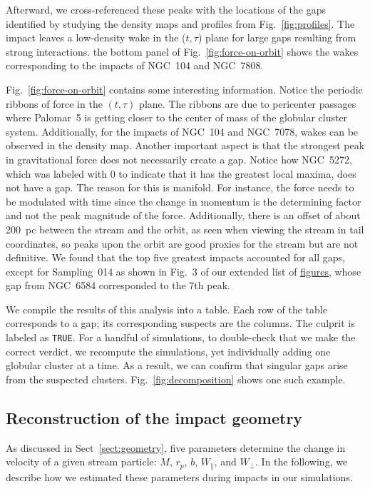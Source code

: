         Afterward, we cross-referenced these peaks with the locations of the gaps identified by studying the density maps and profiles from Fig.~\ref{fig:profiles}. The impact leaves a low-density wake in the ($t,\tau$) plane for large gaps resulting from strong interactions. the bottom panel of Fig.~\ref{fig:force-on-orbit} shows the wakes corresponding to the impacts of NGC~104 and NGC~7808.

        Fig.~\ref{fig:force-on-orbit} contains some interesting information. Notice the periodic ribbons of force in the $(t,\tau)$ plane. The ribbons are due to pericenter passages where Palomar~5 is getting closer to the center of mass of the globular cluster system. Additionally, for the impacts of NGC~104 and NGC~7078, wakes can be observed in the density map. Another important aspect is that the strongest peak in gravitational force does not necessarily create a gap. Notice how NGC~5272, which was labeled with 0 to indicate that it has the greatest local maxima, does not have a gap. The reason for this is manifold. For instance, the force needs to be modulated with time since the change in momentum is the determining factor and not the peak magnitude of the force.  Additionally, there is an offset of about 200~pc between the stream and the orbit, as seen when viewing the stream in tail coordinates, so peaks upon the orbit are good proxies for the stream but are not definitive. We found that the top five greatest impacts accounted for all gaps, except for Sampling~014 as shown in Fig.~3 of our extended list of  \href{10.5281/zenodo.15528089}{figures}, whose gap from NGC~6584 corresponded to the 7th peak. 

        We compile the results of this analysis into a table. Each row of the table corresponds to a gap; its corresponding suspects are the columns. The culprit is labeled as \texttt{TRUE}. For a handful of simulations, to double-check that we make the correct verdict, we recompute the simulations, yet individually adding one globular cluster at a time. As a result, we can confirm that singular gaps arise from the suspected clusters. Fig.~\ref{fig:decomposition} shows one such example. 

    \subsection{Reconstruction of the impact geometry} \label{sec:reconstruction}
        As discussed in Sect~\ref{sect:geometry},  five parameters determine the change in velocity of a given stream particle: $M$, $r_p$, $b$, $W_\parallel$, and $W_\perp$. In the following, we describe how we estimated these parameters during impacts in our simulations.
        
